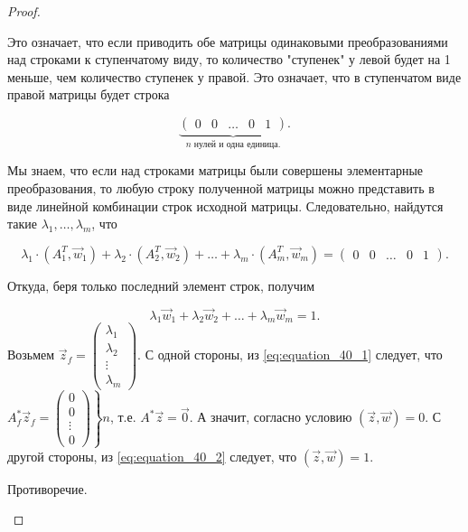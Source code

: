 \begin{proof}
\begin{description}
            Это означает, что если приводить обе матрицы одинаковыми преобразованиями над строками к ступенчатому виду, то количество "ступенек" у левой будет на 1 меньше, чем количество ступенек у правой. Это означает, что в ступенчатом виде правой матрицы будет строка

            $$\underbrace{\left(
                \begin{array}{cccc|c}
                    0 & 0 & \ldots & 0 & 1
                \end{array}
            \right)}_{n \text{ нулей и одна единица.}}.$$

            Мы знаем, что если над строками матрицы были совершены элементарные преобразования, то любую строку полученной матрицы можно представить в виде линейной комбинации строк исходной матрицы. Следовательно, найдутся такие $\lambda_1, \dots, \lambda_m$, что 

            \begin{equation}
                \lambda_1\cdot(A^T_1, \vec{w}_1) + \lambda_2\cdot(A^T_2, \vec{w}_2) + \ldots + \lambda_m\cdot(A^T_m, \vec{w}_m) = \begin{pmatrix}
                     0 & 0 & \ldots & 0 & 1
                 \end{pmatrix}.
                 \label{eq:equation_40_1}
            \end{equation}

            Откуда, беря только последний элемент строк, получим

            \begin{equation}
                \lambda_1\vec{w}_1 + \lambda_2\vec{w}_2 + \ldots + \lambda_m\vec{w}_m = 1.
                \label{eq:equation_40_2}
            \end{equation}
            Возьмем $\vec{z}_f = \begin{pmatrix}
                     \lambda_1 \\
                     \lambda_2 \\
                     \vdots \\
                     \lambda_m
                 \end{pmatrix}.$
            С одной стороны, из \eqref{eq:equation_40_1} следует, что $A^*_f\vec{z}_f = \left. \begin{pmatrix}
                 0 \\
                 0 \\
                 \vdots \\
                 0
             \end{pmatrix} \right\} n$, т.е. $A^*\vec{z} = \vec{0}$. А значит, согласно условию $(\vec{z}, \vec{w}) = 0$. С другой стороны, из \eqref{eq:equation_40_2} следует, что $(\vec{z}, \vec{w}) = 1$. 
             
             Противоречие.
    \end{description}
\end{proof}
